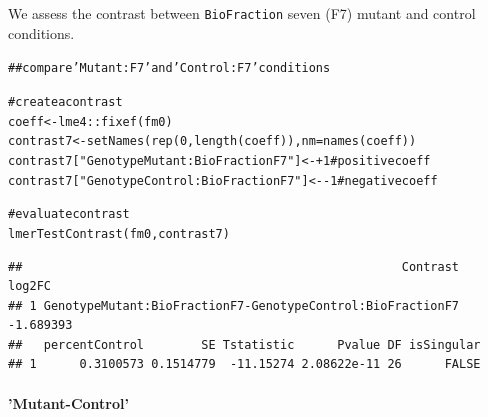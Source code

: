 \documentclass[11pt]{elife}\usepackage[]{graphicx}\usepackage[]{color}
\makeatletter
\newcommand{\hlnum}[1]{\textcolor[rgb]{0.063,0.58,0.627}{#1}}%
\newcommand{\hlstr}[1]{\textcolor[rgb]{0.063,0.58,0.627}{#1}}%
\newcommand{\hlcom}[1]{\textcolor[rgb]{0.588,0.588,0.588}{#1}}%
\newcommand{\hlopt}[1]{\textcolor[rgb]{0.196,0.196,0.196}{#1}}%
\newcommand{\hlstd}[1]{\textcolor[rgb]{0.196,0.196,0.196}{#1}}%
\newcommand{\hlkwb}[1]{\textcolor[rgb]{0.627,0,0.314}{#1}}%
\newcommand{\hlkwc}[1]{\textcolor[rgb]{0,0.631,0.314}{#1}}%
\newcommand{\hlkwd}[1]{\textcolor[rgb]{0.78,0.227,0.412}{#1}}%
\newenvironment{kframe}{%
 \def\at@end@of@kframe{}%
 \ifinner\ifhmode%
  \def\at@end@of@kframe{\end{minipage}}%
  \begin{minipage}{\columnwidth}%
 \fi\fi%
 \def\FrameCommand##1{\hskip\@totalleftmargin \hskip-\fboxsep
 \colorbox{shadecolor}{##1}\hskip-\fboxsep
     \hskip-\linewidth \hskip-\@totalleftmargin \hskip\columnwidth}%
 \MakeFramed {\advance\hsize-\width
   \@totalleftmargin\z@ \linewidth\hsize
   \@setminipage}}%
 {\par\unskip\endMakeFramed%
 \at@end@of@kframe}
\newenvironment{knitrout}{}{} %
\makeatother
\begin{document}
We assess the contrast between \texttt{BioFraction} seven (F7) mutant and
control conditions.
\begin{knitrout}
\color{fgcolor}\begin{kframe}
\begin{alltt}
\hlcom{## compare 'Mutant:F7' and 'Control:F7' conditions}

\hlcom{# create a contrast}
\hlstd{coeff} \hlkwb{<-} \hlstd{lme4}\hlopt{::}\hlkwd{fixef}\hlstd{(fm0)}
\hlstd{contrast7} \hlkwb{<-} \hlkwd{setNames}\hlstd{(}\hlkwd{rep}\hlstd{(}\hlnum{0}\hlstd{,}\hlkwd{length}\hlstd{(coeff)),} \hlkwc{nm} \hlstd{=} \hlkwd{names}\hlstd{(coeff))}
\hlstd{contrast7[}\hlstr{"GenotypeMutant:BioFractionF7"}\hlstd{]} \hlkwb{<-} \hlopt{+}\hlnum{1} \hlcom{# positive coeff}
\hlstd{contrast7[}\hlstr{"GenotypeControl:BioFractionF7"}\hlstd{]} \hlkwb{<-} \hlopt{-}\hlnum{1} \hlcom{# negative coeff}

\hlcom{# evaluate contrast}
\hlkwd{lmerTestContrast}\hlstd{(fm0, contrast7)}
\end{alltt}
\begin{verbatim}
##                                                     Contrast    log2FC
## 1 GenotypeMutant:BioFractionF7-GenotypeControl:BioFractionF7 -1.689393
##   percentControl        SE Tstatistic      Pvalue DF isSingular
## 1      0.3100573 0.1514779  -11.15274 2.08622e-11 26      FALSE
\end{verbatim}
\end{kframe}
\end{knitrout}

\paragraph{'Mutant-Control'}
\end{document}
